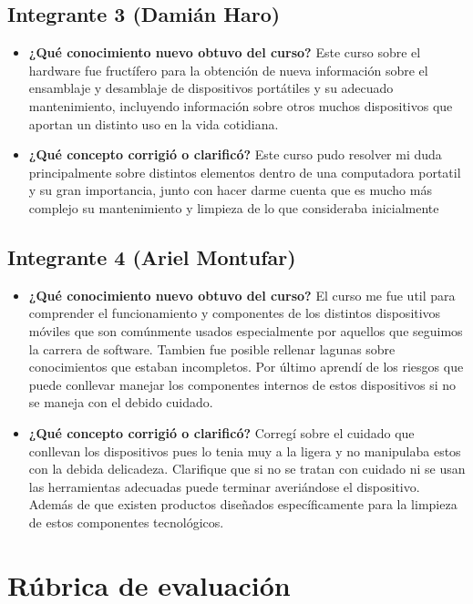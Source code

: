 \documentclass{article}
\begin{document}
\subsection{Integrante 3 (Damián Haro)}
\label{sec:org92e55df}
\begin{itemize}
\item \textbf{¿Qué conocimiento nuevo obtuvo del curso?} Este curso sobre el hardware fue fructífero para la obtención de nueva información sobre el ensamblaje y desamblaje de dispositivos portátiles y su adecuado mantenimiento, incluyendo información sobre otros muchos dispositivos que aportan un distinto uso en la vida cotidiana.
\item \textbf{¿Qué concepto corrigió o clarificó?} Este curso pudo resolver mi duda principalmente sobre distintos elementos dentro de una computadora portatil y su gran importancia, junto con hacer darme cuenta que es mucho más complejo su mantenimiento y limpieza de lo que consideraba inicialmente
\end{itemize}

\subsection{Integrante 4 (Ariel Montufar)}
\label{sec:org1c76f2e}
\begin{itemize}
\item \textbf{¿Qué conocimiento nuevo obtuvo del curso?} El curso me fue util para comprender el funcionamiento y componentes de los distintos dispositivos móviles que son comúnmente usados especialmente por aquellos que seguimos la carrera de software. Tambien fue posible rellenar lagunas sobre conocimientos que estaban incompletos. Por último aprendí de los riesgos que puede conllevar manejar los componentes internos de estos dispositivos si no se maneja con el debido cuidado.
\item \textbf{¿Qué concepto corrigió o clarificó?} Corregí sobre el cuidado que conllevan los dispositivos pues lo tenia muy a la ligera y no manipulaba estos con la debida delicadeza. Clarifique que si no se tratan con cuidado ni se usan las herramientas adecuadas puede terminar averiándose el dispositivo. Además de que existen productos diseñados específicamente para la limpieza de estos componentes tecnológicos.
\end{itemize}

\section{Rúbrica de evaluación}
\label{sec:org0a92247}
\end{document}
